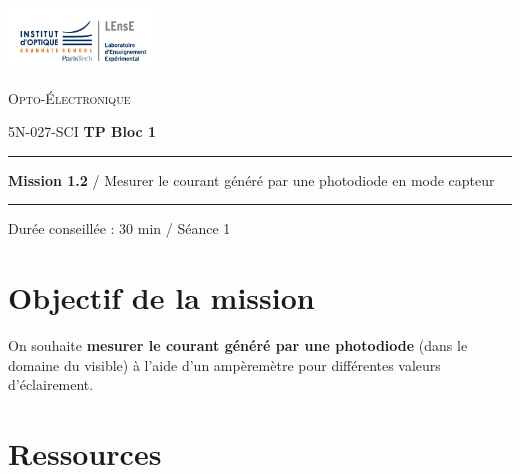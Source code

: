 \newpage
\pagestyle{empty}

\begin{minipage}[c]{.25\linewidth}
	\includegraphics[width=4cm]{images/Logo-LEnsE.png}
\end{minipage} \hfill
\begin{minipage}[c]{.4\linewidth}

\begin{center}
\vspace{0.3cm}
{\Large \textsc{Opto-Électronique}}

\medskip

5N-027-SCI \qquad \textbf{\Large TP Bloc 1}

\end{center}
\end{minipage}\hfill

\vspace{0.5cm}

\noindent \rule{\linewidth}{1pt}

{\noindent\Large  \rule[-7pt]{0pt}{30pt}  \textbf{Mission 1.2} / Mesurer le courant généré par une photodiode en mode capteur} 

\noindent \rule{\linewidth}{1pt}

\vspace{-0.5cm}

\begin{center}

Durée conseillée : 30 min / Séance 1

\end{center}

\section{Objectif de la mission}
\label{mission12}

On souhaite \textbf{mesurer le courant généré par une photodiode} (dans le domaine du visible) à l'aide d'un ampèremètre pour différentes valeurs d'éclairement.


\section{Ressources}


